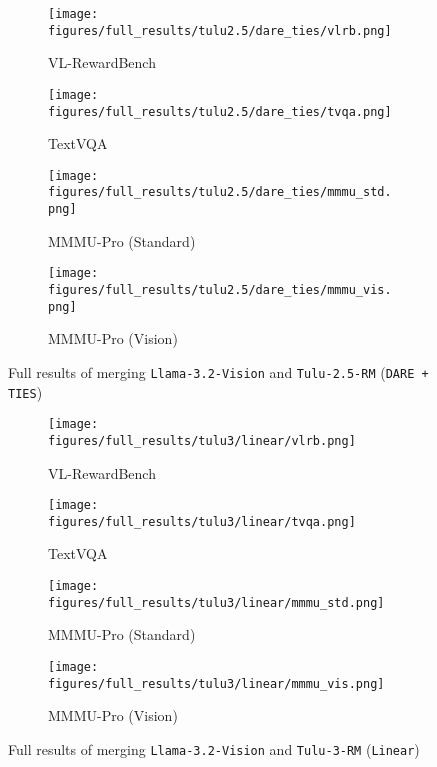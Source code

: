 \begin{figure*}[ht]
     \centering
     \begin{subfigure}[b]{0.245\linewidth}
         \centering
         \texttt{[image: figures/full\_results/tulu2.5/dare\_ties/vlrb.png]}
         \caption{VL-RewardBench}
     \end{subfigure}
     \hfill
     \begin{subfigure}[b]{0.245\linewidth}
         \centering
         \texttt{[image: figures/full\_results/tulu2.5/dare\_ties/tvqa.png]}
         \caption{TextVQA}
     \end{subfigure}
     \hfill
      \begin{subfigure}[b]{0.245\linewidth}
         \centering
         \texttt{[image: figures/full\_results/tulu2.5/dare\_ties/mmmu\_std.png]}
         \caption{MMMU-Pro (Standard)}
     \end{subfigure}
     \hfill
     \begin{subfigure}[b]{0.245\linewidth}
         \centering
         \texttt{[image: figures/full\_results/tulu2.5/dare\_ties/mmmu\_vis.png]}
         \caption{MMMU-Pro (Vision)}
     \end{subfigure}
        \caption{Full results of merging \texttt{Llama-3.2-Vision} and \texttt{Tulu-2.5-RM} (\texttt{DARE + TIES})}
        \vspace{-10pt}
        \label{fig:full_tulu2.5_dare_ties}
\end{figure*}

\begin{figure*}[ht]
     \centering
     \begin{subfigure}[b]{0.245\linewidth}
         \centering
         \texttt{[image: figures/full\_results/tulu3/linear/vlrb.png]}
         \caption{VL-RewardBench}
     \end{subfigure}
     \hfill
     \begin{subfigure}[b]{0.245\linewidth}
         \centering
         \texttt{[image: figures/full\_results/tulu3/linear/tvqa.png]}
         \caption{TextVQA}
     \end{subfigure}
     \hfill
      \begin{subfigure}[b]{0.245\linewidth}
         \centering
         \texttt{[image: figures/full\_results/tulu3/linear/mmmu\_std.png]}
         \caption{MMMU-Pro (Standard)}
     \end{subfigure}
     \hfill
     \begin{subfigure}[b]{0.245\linewidth}
         \centering
         \texttt{[image: figures/full\_results/tulu3/linear/mmmu\_vis.png]}
         \caption{MMMU-Pro (Vision)}
     \end{subfigure}
        \caption{Full results of merging \texttt{Llama-3.2-Vision} and \texttt{Tulu-3-RM} (\texttt{Linear})}
        \vspace{-10pt}
        \label{fig:full_tulu3_linear}
\end{figure*}

